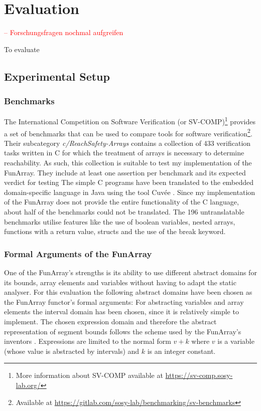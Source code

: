 \chapter{Evaluation}
\textcolor{red}{-- Forschungsfragen nochmal aufgreifen}

To evaluate 

\section{Experimental Setup}
\subsection{Benchmarks}

The International Competition on Software Verification (or SV-COMP)\footnote{More information about SV-COMP available at \url{https://sv-comp.sosy-lab.org/}} provides a set of benchmarks that can be used to compare tools for software verification\footnote{Available at \url{https://gitlab.com/sosy-lab/benchmarking/sv-benchmarks}}. Their subcategory \textit{c/ReachSafety-Arrays} contains a collection of 433 verification tasks written in C for which the treatment of arrays is necessary to determine reachability. As such, this collection is suitable to test my implementation of the FunArray. They include at least one assertion per benchmark and its expected verdict for testing 
The simple C programs have been translated to the embedded domain-specific language in Java using the tool Cuv\'ee \cite{ernst2020}. Since my implementation of the FunArray does not provide the entire functionality of the C language, about half of the benchmarks could not be translated. The 196 untranslatable benchmarks utilise features like the use of boolean variables, nested arrays, functions with a return value, structs and the use of the break keyword.

\subsection{Formal Arguments of the FunArray}

One of the FunArray's strengths is its ability to use different abstract domains for its bounds, array elements and variables without having to adapt the static analyser. For this evaluation the following abstract domains have been chosen as the FunArray functor's formal arguments: For abstracting variables and array elements the interval domain has been chosen, since it is relatively simple to implement. The chosen expression domain and therefore the abstract representation of segment bounds follows the scheme used by the FunArray's inventors \cite[section 7.2]{cousot2011}. Expressions are limited to the normal form $v+k$ where $v$ is a variable (whose value is abstracted by intervals) and $k$ is an integer constant.

